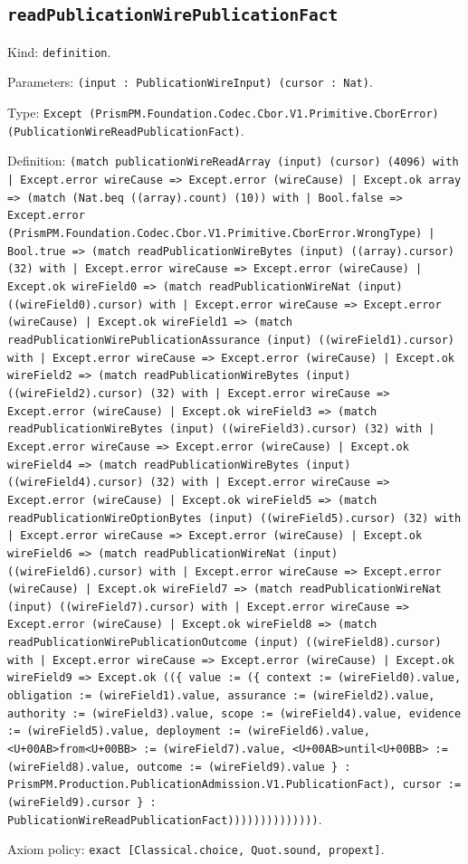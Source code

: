 \documentclass[11pt]{article}
\begin{document}
\subsection*{\texttt{readPublicationWirePublicationFact}}
\noindent Kind: \texttt{definition}.\par
\noindent Parameters: \texttt{(input : PublicationWireInput) (cursor : Nat)}.\par
\noindent Type: \texttt{Except (PrismPM.Foundation.Codec.Cbor.V1.Primitive.CborError) (PublicationWireReadPublicationFact)}.\par
\noindent Definition: \texttt{(match publicationWireReadArray (input) (cursor) (4096) with | Except.error wireCause => Except.error (wireCause) | Except.ok array => (match (Nat.beq ((array).count) (10)) with | Bool.false => Except.error (PrismPM.Foundation.Codec.Cbor.V1.Primitive.CborError.WrongType) | Bool.true => (match readPublicationWireBytes (input) ((array).cursor) (32) with | Except.error wireCause => Except.error (wireCause) | Except.ok wireField0 => (match readPublicationWireNat (input) ((wireField0).cursor) with | Except.error wireCause => Except.error (wireCause) | Except.ok wireField1 => (match readPublicationWirePublicationAssurance (input) ((wireField1).cursor) with | Except.error wireCause => Except.error (wireCause) | Except.ok wireField2 => (match readPublicationWireBytes (input) ((wireField2).cursor) (32) with | Except.error wireCause => Except.error (wireCause) | Except.ok wireField3 => (match readPublicationWireBytes (input) ((wireField3).cursor) (32) with | Except.error wireCause => Except.error (wireCause) | Except.ok wireField4 => (match readPublicationWireBytes (input) ((wireField4).cursor) (32) with | Except.error wireCause => Except.error (wireCause) | Except.ok wireField5 => (match readPublicationWireOptionBytes (input) ((wireField5).cursor) (32) with | Except.error wireCause => Except.error (wireCause) | Except.ok wireField6 => (match readPublicationWireNat (input) ((wireField6).cursor) with | Except.error wireCause => Except.error (wireCause) | Except.ok wireField7 => (match readPublicationWireNat (input) ((wireField7).cursor) with | Except.error wireCause => Except.error (wireCause) | Except.ok wireField8 => (match readPublicationWirePublicationOutcome (input) ((wireField8).cursor) with | Except.error wireCause => Except.error (wireCause) | Except.ok wireField9 => Except.ok ((\{ value := (\{ context := (wireField0).value, obligation := (wireField1).value, assurance := (wireField2).value, authority := (wireField3).value, scope := (wireField4).value, evidence := (wireField5).value, deployment := (wireField6).value, <U+00AB>from<U+00BB> := (wireField7).value, <U+00AB>until<U+00BB> := (wireField8).value, outcome := (wireField9).value \} : PrismPM.Production.PublicationAdmission.V1.PublicationFact), cursor := (wireField9).cursor \} : PublicationWireReadPublicationFact))))))))))))))}.\par
\noindent Axiom policy: \texttt{exact [Classical.choice, Quot.sound, propext]}.\par
\end{document}
